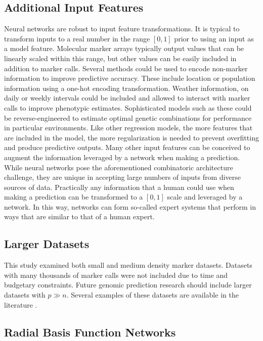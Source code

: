 \subsection*{Additional Input Features}

Neural networks are robust to input feature transformations. It is typical 
to transform inputs to a real number in the range $[0,1]$ prior to using 
an input as a model feature. Molecular marker arrays typically output values that
can be linearly scaled within this range, but other values can be easily included
in addition to marker calls. Several methods could be used to encode non-marker information
to improve predictive accuracy. These include location or population information using
a one-hot encoding transformation. Weather information, on daily or weekly intervals could
be included and allowed to interact with marker calls to improve phenotypic estimates.
Sophisticated models such as these could be reverse-engineered to estimate optimal
genetic combinations for performance in particular environments. Like other regression
models, the more features that are included in the model, the more regularization is needed
to prevent overfitting and produce predictive outputs. Many other input features
can be conceived to augment the information leveraged by a network when making
a prediction. While neural networks pose the aforementioned combinatoric architecture
challenge, they are unique in accepting large numbers of inputs from diverse 
sources of data. Practically any information that a human could use when making
a prediction can be transformed to a $[0,1]$ scale and leveraged by a
network. In this way, networks can form so-called expert systems that perform
in ways that are similar to that of a human expert.

\subsection*{Larger Datasets}

This study examined both small and medium density marker datasets. Datasets with
many thousands of marker calls were not included due to time and budgetary constraints.
Future genomic prediction research should include larger datasets with $p \gg n$. Several
examples of these datasets are available in the literature \citep{resende2012, cleveland2012}.

\subsection*{Radial Basis Function Networks}

